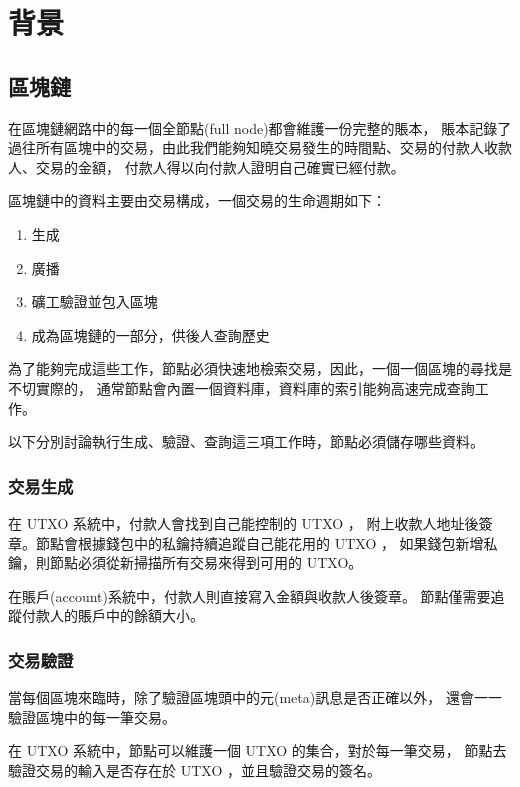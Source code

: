 \graphicspath{ {./images/} }
\chapter{背景}
\label{c:background}

\section{區塊鏈}

在區塊鏈網路中的每一個全節點(full node)都會維護一份完整的賬本，
賬本記錄了過往所有區塊中的交易，由此我們能夠知曉交易發生的時間點、交易的付款人收款人、交易的金額，
付款人得以向付款人證明自己確實已經付款。

區塊鏈中的資料主要由交易構成，一個交易的生命週期如下：

\begin{enumerate}
  \item 生成
  \item 廣播
  \item 礦工驗證並包入區塊
  \item 成為區塊鏈的一部分，供後人查詢歷史
\end{enumerate}

為了能夠完成這些工作，節點必須快速地檢索交易，因此，一個一個區塊的尋找是不切實際的， 
通常節點會內置一個資料庫，資料庫的索引能夠高速完成查詢工作。

以下分別討論執行生成、驗證、查詢這三項工作時，節點必須儲存哪些資料。

\subsection{交易生成}

在 UTXO 系統中，付款人會找到自己能控制的 UTXO ，
附上收款人地址後簽章。節點會根據錢包中的私鑰持續追蹤自己能花用的 UTXO ，
如果錢包新增私鑰，則節點必須從新掃描所有交易來得到可用的 UTXO。

在賬戶(account)系統中，付款人則直接寫入金額與收款人後簽章。
節點僅需要追蹤付款人的賬戶中的餘額大小。

\subsection{交易驗證}

當每個區塊來臨時，除了驗證區塊頭中的元(meta)訊息是否正確以外，
還會一一驗證區塊中的每一筆交易。

在 UTXO 系統中，節點可以維護一個 UTXO 的集合，對於每一筆交易，
節點去驗證交易的輸入是否存在於 UTXO ，並且驗證交易的簽名。

